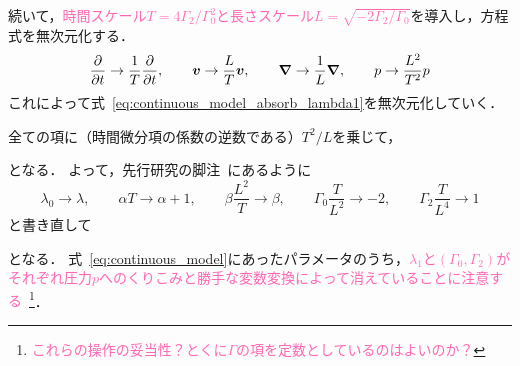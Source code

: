 \documentclass[12pt,dvipdfmx,svgnames,a4paper,uplatex]{ujarticle}
\theoremstyle{plain}
\begin{document}
続いて，\textcolor{HotPink}{時間スケール\(T = 4\Gamma_2/\Gamma_0^2\)と長さスケール\(L = \sqrt{-2\Gamma_2/\Gamma_0}\)}を導入し，方程式を無次元化する．
\begin{equation}
  \pdv{t} \to \frac{1}{T} \pdv{t}, \qquad \vb*{v} \to \frac{L}{T} \vb*{v}, \qquad \grad \to \frac{1}{L} \grad, \qquad p \to \frac{L^2}{T^2} p
  \label{eq:nondimensionalization_list}
\end{equation}
これによって式~\ref{eq:continuous_model_absorb_lambda1}を無次元化していく．
全ての項に（時間微分項の係数の逆数である）\(T^2/L\)を乗じて，
となる．
よって，先行研究の脚注~\cite[脚注28]{James2017}にあるように
\begin{equation}
  \lambda_0 \to \lambda, \qquad \alpha T \to \alpha + 1, \qquad \beta \frac{L^2}{T} \to \beta, \qquad \Gamma_0 \frac{T}{L^2} \to -2, \qquad \Gamma_2 \frac{T}{L^4} \to 1
  \label{eq:redefine_parameters}
\end{equation}
と書き直して
となる．
式~\ref{eq:continuous_model}にあったパラメータのうち，\textcolor{HotPink}{\(\lambda_1\)と\((\Gamma_0, \Gamma_2)\)がそれぞれ圧力\(p\)へのくりこみと勝手な変数変換によって消えていることに注意する}~\footnote{\textcolor{HotPink}{これらの操作の妥当性？とくに\(\Gamma\)の項を定数としているのはよいのか？}}．
\end{document}
